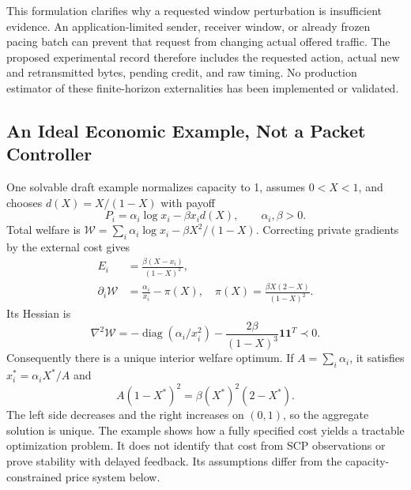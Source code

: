 \documentclass[conference,letterpaper]{IEEEtran}
\begin{document}
This formulation clarifies why a requested window perturbation is insufficient evidence. An application-limited sender, receiver window, or already frozen pacing batch can prevent that request from changing actual offered traffic. The proposed experimental record therefore includes the requested action, actual new and retransmitted bytes, pending credit, and raw timing. No production estimator of these finite-horizon externalities has been implemented or validated.

\subsection{An Ideal Economic Example, Not a Packet Controller}
One solvable draft example normalizes capacity to 1, assumes $0<X<1$, and chooses $d(X)=X/(1-X)$ with payoff
\begin{equation}
P_i=\alpha_i\log x_i-\beta x_i d(X),\qquad \alpha_i,\beta>0.
\end{equation}
Total welfare is $\mathcal W=\sum_i\alpha_i\log x_i-\beta X^2/(1-X)$. Correcting private gradients by the external cost gives
\begin{align}
E_i&=\frac{\beta(X-x_i)}{(1-X)^2},\\
\partial_i\mathcal W&=\frac{\alpha_i}{x_i}-\pi(X),\quad
\pi(X)=\frac{\beta X(2-X)}{(1-X)^2}.
\end{align}
Its Hessian is
\begin{equation}
\nabla^2\mathcal W=-\operatorname{diag}(\alpha_i/x_i^2)
-\frac{2\beta}{(1-X)^3}\mathbf1\mathbf1^T\prec0.
\end{equation}
Consequently there is a unique interior welfare optimum. If $A=\sum_i\alpha_i$, it satisfies $x_i^*=\alpha_iX^*/A$ and
\begin{equation}
A(1-X^*)^2=\beta(X^*)^2(2-X^*).
\end{equation}
The left side decreases and the right increases on $(0,1)$, so the aggregate solution is unique. The example shows how a fully specified cost yields a tractable optimization problem. It does not identify that cost from SCP observations or prove stability with delayed feedback. Its assumptions differ from the capacity-constrained price system below.
\end{document}

